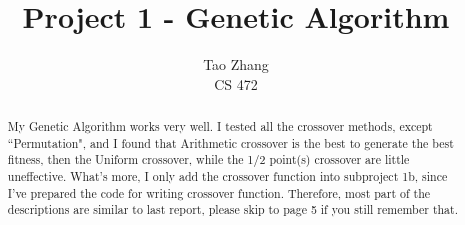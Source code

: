 \documentclass[12pt]{article}
\begin{document}
\title{Project 1 - Genetic Algorithm}

\author{Tao Zhang\\
CS 472}

\maketitle
\newpage


\begin{abstract}
My Genetic Algorithm works very well. I tested all the crossover methods, except ``Permutation", and I found that Arithmetic crossover is the best to generate the best fitness, then the Uniform crossover, while the 1/2 point(s) crossover are little uneffective. What's more, I only add the crossover function into subproject 1b, since I've prepared the code for writing crossover function. Therefore, most part of the descriptions are similar to last report, please skip to page 5 if you still remember that.
\end{abstract}
\end{document}

